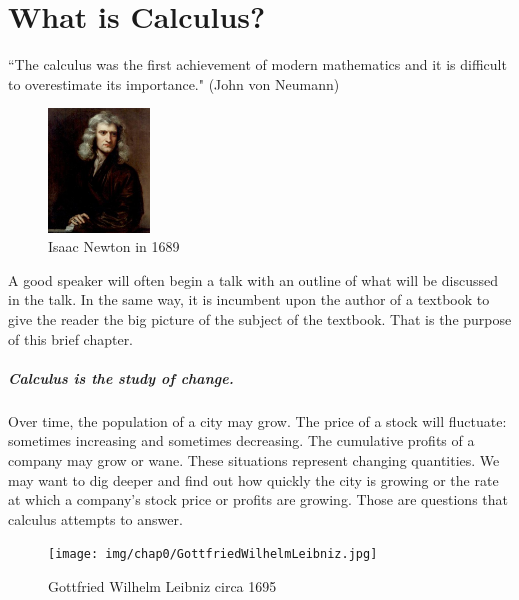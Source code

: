 \chapter{What is Calculus?}
\label{ch:whatiscalculus}

\begin{center}
``The calculus was the first achievement of modern mathematics and it is difficult to overestimate its importance." (John von Neumann)
\end{center}

\begin{figure}
  \centering
    \includegraphics[width=0.24\textwidth]{img/chap0/IsaacNewton.jpg}
\caption{Isaac Newton in 1689}
\end{figure}

A good speaker will often begin a talk with an outline of what will be discussed in the talk. In the same way, it is incumbent upon the author of a textbook to give the reader the big picture of the subject of the textbook. That is the purpose of this brief chapter.

\paragraph{Calculus is the study of change.} Over time, the population of a city may grow. The price of a stock will fluctuate: sometimes increasing and sometimes decreasing. The cumulative profits of a company may grow or wane. These situations represent changing quantities. We may want to dig deeper and find out how quickly the city is growing or the rate at which a company's stock price or profits are growing. Those are questions that calculus attempts to answer.

\begin{figure}
 \centering
    \texttt{[image: img/chap0/GottfriedWilhelmLeibniz.jpg]}
  \caption{Gottfried Wilhelm Leibniz circa 1695}
\end{figure}

